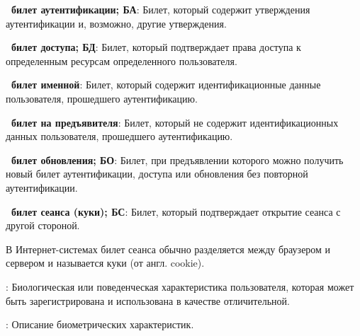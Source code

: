 {\bf \thedefctr~билет аутентификации; БА}:
Билет, который содержит утверждения аутентификации и, возможно, другие
утверждения.

{\bf \thedefctr~билет доступа; БД}:
Билет, который подтверждает права доступа к определенным ресурсам определенного 
пользователя.

{\bf \thedefctr~билет именной}:
Билет, который содержит идентификационные данные пользователя, прошедшего 
аутентификацию.

{\bf \thedefctr~билет на предъявителя}:
Билет, который не содержит идентификационных данных пользователя, прошедшего 
аутентификацию.

{\bf \thedefctr~билет обновления; БО}:
Билет, при предъявлении которого можно получить новый билет 
аутентификации, доступа или обновления без повторной аутентификации.


{\bf \thedefctr~билет сеанса (куки); БС}:
Билет, который подтверждает открытие сеанса с другой стороной. 

\begin{note*}
В Интернет-системах билет сеанса обычно разделяется между браузером и 
сервером и называется куки (от англ. cookie).
\end{note*}

:
Биологическая или поведенческая характеристика пользователя,
которая может быть зарегистрирована и использована в качестве отличительной.

:
Описание биометрических характеристик. 

%
% 
% 
%
% 

